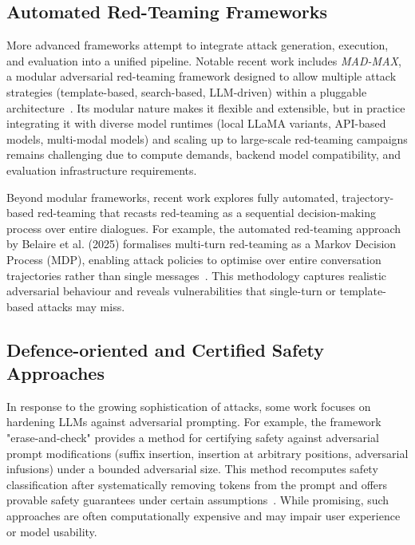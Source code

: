 \subsection{Automated Red-Teaming Frameworks}\label{subsec:madmax-automatic}

More advanced frameworks attempt to integrate attack generation, execution, and evaluation into a unified pipeline.
Notable recent work includes {\em MAD-MAX}, a modular adversarial red-teaming framework designed to allow multiple attack strategies (template-based, search-based, LLM-driven) within a pluggable architecture~\cite{schoepf2025madmax}.
Its modular nature makes it flexible and extensible, but in practice integrating it with diverse model runtimes (local LLaMA variants, API-based models, multi-modal models) and scaling up to large-scale red-teaming campaigns remains challenging due to compute demands, backend model compatibility, and evaluation infrastructure requirements.

Beyond modular frameworks, recent work explores fully automated, trajectory-based red-teaming that recasts red-teaming as a sequential decision-making process over entire dialogues.
For example, the automated red-teaming approach by Belaire et al. (2025) formalises multi-turn red-teaming as a Markov Decision Process (MDP), enabling attack policies to optimise over entire conversation trajectories rather than single messages~\cite{belaire2025automatic}.
This methodology captures realistic adversarial behaviour and reveals vulnerabilities that single-turn or template-based attacks may miss.

\subsection{Defence-oriented and Certified Safety Approaches}\label{subsec:defences}

In response to the growing sophistication of attacks, some work focuses on hardening LLMs against adversarial prompting.
For example, the framework "erase-and-check" provides a method for certifying safety against adversarial prompt modifications (suffix insertion, insertion at arbitrary positions, adversarial infusions) under a bounded adversarial size.
This method recomputes safety classification after systematically removing tokens from the prompt and offers provable safety guarantees under certain assumptions~\cite{kumar2025certifying}.
While promising, such approaches are often computationally expensive and may impair user experience or model usability.

